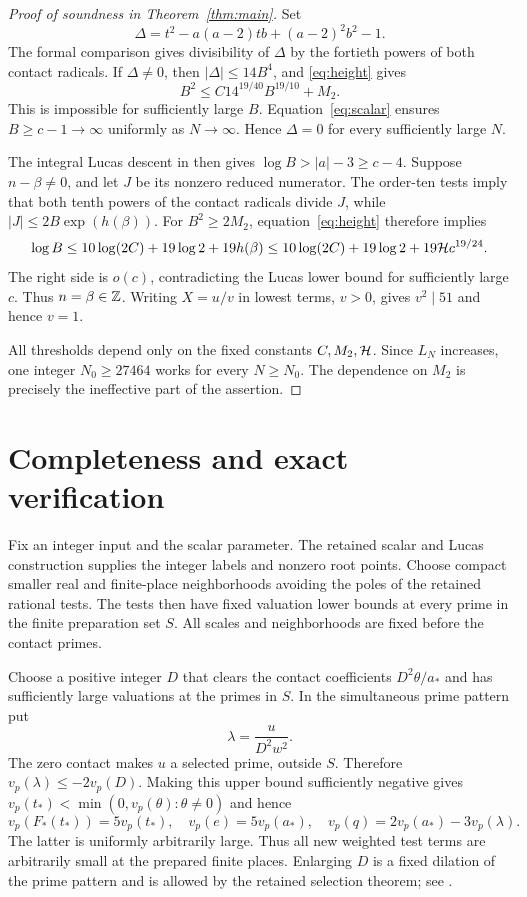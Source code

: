 \documentclass[11pt,a4paper]{article}
\theoremstyle{remark}\newtheorem{remark}[theorem]{Remark}
\begin{document}
\begin{proof}[Proof of soundness in Theorem~\ref{thm:main}]
Set
\[
 \Delta=t^2-a(a-2)tb+(a-2)^2b^2-1.
\]
The formal comparison gives divisibility of $\Delta$ by the fortieth
powers of both contact radicals. If $\Delta\ne0$, then
$|\Delta|\le14B^4$, and \eqref{eq:height} gives
\[
                     B^2\le C14^{19/40}B^{19/10}+M_2.
\]
This is impossible for sufficiently large $B$. Equation~\eqref{eq:scalar}
ensures $B\ge c-1\to\infty$ uniformly as $N\to\infty$. Hence
$\Delta=0$ for every sufficiently large $N$.

The integral Lucas descent in \cite{Source} then gives
$\log B>|a|-3\ge c-4$. Suppose $n-\beta\ne0$, and let $J$ be
its nonzero reduced numerator. The order-ten tests imply that both
tenth powers of the contact radicals divide $J$, while
$|J|\le2B\exp(h(\beta))$. For $B^2\ge2M_2$, equation~\eqref{eq:height}
therefore implies
\[
 \log B\le10\log(2C)+19\log2+19h(\beta)
          \le10\log(2C)+19\log2+19\mathcal H c^{19/24}.
\]
The right side is $o(c)$, contradicting the Lucas lower bound for
sufficiently large $c$. Thus $n=\beta\in\mathbb Z$. Writing $X=u/v$ in
lowest terms, $v>0$, gives $v^2\mid51$ and hence $v=1$.

All thresholds depend only on the fixed constants $C,M_2,\mathcal H$.
Since $L_N$ increases, one integer $N_0\ge27464$ works for every
$N\ge N_0$. The dependence on $M_2$ is precisely the ineffective
part of the assertion.
\end{proof}

\section{Completeness and exact verification}
Fix an integer input and the scalar parameter. The retained scalar and
Lucas construction supplies the integer labels and nonzero root points.
Choose compact smaller real and finite-place neighborhoods avoiding the
poles of the retained rational tests. The tests then have fixed valuation
lower bounds at every prime in the finite preparation set $S$.
All scales and neighborhoods are fixed before the contact primes.

Choose a positive integer $D$ that clears the contact coefficients
$D^2\theta/a_*$ and has sufficiently large valuations at the primes in
$S$. In the simultaneous prime pattern put
\[
 \lambda=\frac{u}{D^2w^2}.
\]
The zero contact makes $u$ a selected prime, outside $S$. Therefore
$v_p(\lambda)\le-2v_p(D)$. Making this upper bound sufficiently negative
gives $v_p(t_*)<\min(0,v_p(\theta):\theta\ne0)$ and hence
\[
 v_p(F_*(t_*))=5v_p(t_*),\quad
 v_p(e)=5v_p(a_*),\quad
 v_p(q)=2v_p(a_*)-3v_p(\lambda).
\]
The latter is uniformly arbitrarily large. Thus all new weighted test
terms are arbitrarily small at the prepared finite places. Enlarging $D$
is a fixed dilation of the prime pattern and is allowed by the retained
selection theorem; see \cite{Selection}.
\end{document}
